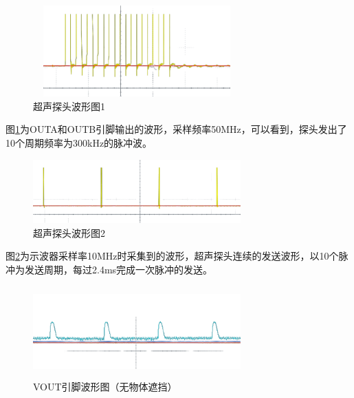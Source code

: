 \begin{figure}[!h]
	\centering
	\includegraphics[width=8cm,height=3.5cm]{figure/debug waveform3.png}
	\caption{超声探头波形图1}
	\label{超声探头波形图1}
\end{figure}\par
图\ref{超声探头波形图1}为OUTA和OUTB引脚输出的波形，采样频率50MHz，可以看到，探头发出了10个周期频率为300kHz的脉冲波。
\begin{figure}[!h]
	\centering
	\includegraphics[width=8cm]{figure/debug waveform4.png}
	\caption{超声探头波形图2}
	\label{超声探头波形图2}
\end{figure}\par
图\ref{超声探头波形图2}为示波器采样率10MHz时采集到的波形，超声探头连续的发送波形，以10个脉冲为发送周期，每过2.4ms完成一次脉冲的发送。
\newpage
\begin{figure}[!h]
	\centering
	\includegraphics[width=8cm,height=3.5cm]{figure/debug waveform5.png}
	\caption{VOUT引脚波形图（无物体遮挡）}
	\label{VOUT引脚波形图（无物体遮挡）}
\end{figure}\par

